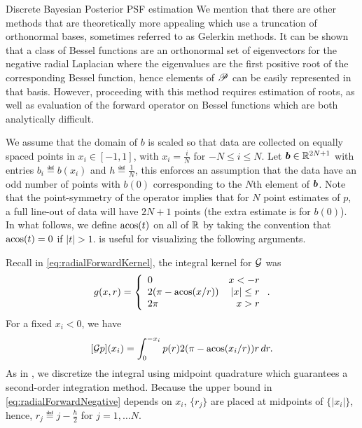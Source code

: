 \begin{chapter}{Discrete Bayesian Posterior PSF estimation}
We mention that there are other methods that are theoretically more appealing which use a truncation of orthonormal bases, sometimes referred to as Gelerkin methods.
It can be shown that a class of Bessel functions are an orthonormal set of eigenvectors for the negative radial Laplacian where the eigenvalues are the first positive root of the corresponding Bessel function, hence elements of $\mathscr P$ can be easily represented in that basis.
However, proceeding with this method requires estimation of roots, as well as evaluation of the forward operator on Bessel functions which are both analytically difficult.


We assume that the domain of $b$ is scaled so that data are collected on equally spaced points in $x_i \in [-1,1]$, with $x_i = \frac iN$ for $-N\le i\le N$.
Let $\mbox{\boldmath$b$} \in \mathbb R^{2N + 1}$ with entries $b_i \eqdef b(x_i)$ and $h\eqdef \frac 1N$, this enforces an assumption that the data have an odd number of points with $b(0)$ corresponding to the $N$th element of $\mbox{\boldmath$b$}$. 
Note that the point-symmetry of the operator implies that for $N$ point estimates of $p$, a full line-out of data will have $2N + 1$ points (the extra estimate is for $b(0)$).
In what follows, we define $\operatorname*{acos}(t)$ on all of $\mathbb R$ by taking the convention that $\operatorname*{acos}(t) = 0$ if $|t| > 1$.
 is useful for visualizing the following arguments.

Recall in \eqref{eq:radialForwardKernel}, the integral kernel for $\mathcal G$ was
\begin{equation} 
  g(x,r) = \left\{\begin{array}{lr}
    0 & x < - r\\
    2(\pi - \operatorname*{acos}(x/r)) & |x| \le r\\
    2\pi &  x> r
  \end{array}\right..  
\end{equation}
For a fixed  $x_i<0$, we have
\begin{equation} \label{eq:radialForwardNegative}
  [\mathcal G p](x_i) = \int_0^{-x_i} p(r)2(\pi - \operatorname*{acos}(x_i/r))r\,dr.
\end{equation}
As in \citep{bardsley2012mcmc}, we discretize the integral using midpoint quadrature which guarantees a second-order integration method.
Because the upper bound in \eqref{eq:radialForwardNegative} depends on $x_i$, $\{r_j\}$ are placed at midpoints of $\{|x_i|\}$, hence, $r_j \eqdef j-\frac h2$ for $j=1,\dots N$. 


\end{chapter}
